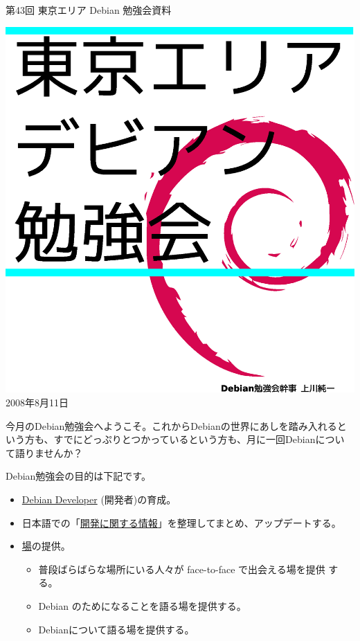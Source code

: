 \documentclass[mingoth,a4paper]{jsarticle}
\newcommand{\debmtgyear}{2008}
\newcommand{\debmtgmonth}{8}
\newcommand{\debmtgdate}{11}
\newcommand{\debmtgnumber}{43}
\begin{document}
\begin{titlepage}
\thispagestyle{empty}


\vspace*{-2cm}
第\debmtgnumber{}回 東京エリア Debian 勉強会資料

\hspace*{-2.4cm}
\includegraphics[width=210mm]{image200801/2008title.eps}\\
\hfill{}\debmtgyear{}年\debmtgmonth{}月\debmtgdate{}日

\end{titlepage}

 
 今月のDebian勉強会へようこそ。これからDebianの世界にあしを踏み入れると
 いう方も、すでにどっぷりとつかっているという方も、月に一回Debianについ
 て語りませんか？

 Debian勉強会の目的は下記です。

\begin{itemize}
 \item \underline{Debian Developer} (開発者)の育成。
 \item 日本語での「\underline{開発に関する情報}」を整理してまとめ、アップデートする。
 \item \underline{場}の提供。
 \begin{itemize}
  \item 普段ばらばらな場所にいる人々が face-to-face で出会える場を提供
	する。
  \item Debian のためになることを語る場を提供する。
  \item Debianについて語る場を提供する。
 \end{itemize}
\end{itemize}		
\end{document}
